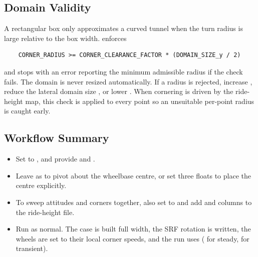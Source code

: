 \subsection{Domain Validity}
A rectangular box only approximates a curved tunnel when the turn radius is large relative to the box width.  enforces
\begin{lstlisting}
    CORNER_RADIUS >= CORNER_CLEARANCE_FACTOR * (DOMAIN_SIZE_y / 2)
\end{lstlisting}
and stops with an error reporting the minimum admissible radius if the check fails. The domain is never resized automatically. If a radius is rejected, increase , reduce the lateral domain size  , or lower . When cornering is driven by the ride-height map, this check is applied to every point so an unsuitable per-point radius is caught early.

\subsection{Workflow Summary}
\begin{itemize}
    \item Set  to , and provide  and .

    \item Leave  as  to pivot about the wheelbase centre, or set three floats to place the centre explicitly.

    \item To sweep attitudes and corners together, also set  to  and add  and  columns to the ride-height file.

    \item Run  as normal. The case is built full width, the SRF rotation is written, the wheels are set to their local corner speeds, and the run uses  ( for steady,  for transient).
\end{itemize}

